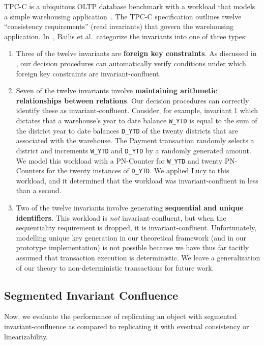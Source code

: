 \example[TPC-C]
TPC-C is a ubiquitous OLTP database benchmark with a workload that models a
simple warehousing application~\cite{difallah2013oltp}. The TPC-C specification
outlines twelve ``consistency requirements'' (read invariants) that govern the
warehousing application. In~\cite{bailis2014coordination}, Bailis et al.\
categorize the invariants into one of three types:
\begin{enumerate}
  \item
    Three of the twelve invariants are \textbf{foreign key constraints}.  As
    discussed in \exampleref{ForeignKeysEval}, our decision procedures can
    automatically verify conditions under which foreign key constraints are
    invariant-confluent.

  \item
    \newcommand{\ttt}[1]{{\smaller \texttt{#1}}}
    Seven of the twelve invariants involve \textbf{maintaining arithmetic
    relationships between relations}. Our decision procedures can correctly
    identify these as invariant-confluent. Consider, for example, invariant 1
    which dictates that a warehouse's year to date balance \ttt{W\_YTD} is
    equal to the sum of the district year to date balances \ttt{D\_YTD} of the
    twenty districts that are associated with the warehouse. The Payment
    transaction randomly selects a district and increments \ttt{W\_YTD} and
    \ttt{D\_YTD} by a randomly generated amount. We model this workload with a
    PN-Counter for \ttt{W\_YTD} and twenty PN-Counters for the twenty instances
    of \ttt{D\_YTD}. We applied Lucy to this workload, and it determined that
    the workload was invariant-confluent in less than a second.

  \item
    Two of the twelve invariants involve generating \textbf{sequential and
    unique identifiers}. This workload is \emph{not} invariant-confluent, but
    when the sequentiality requirement is dropped, it is invariant-confluent.
    Unfortunately, modelling unique key generation in our theoretical framework
    (and in our prototype implementation) is not possible because we have thus
    far tacitly assumed that transaction execution is deterministic. We leave a
    generalization of our theory to non-deterministic transactions for future
    work.
\end{enumerate}

\subsection{Segmented Invariant Confluence}%
Now, we evaluate the performance of replicating an object with segmented
invariant-confluence as compared to replicating it with eventual consistency or
linearizability.

